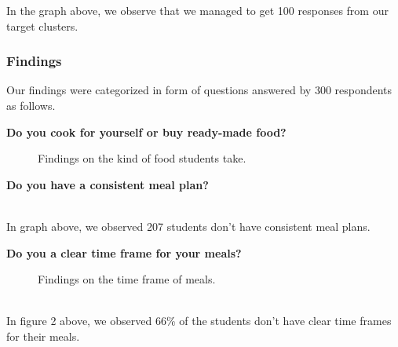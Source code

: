 \documentclass{article}
\begin{document}
In the graph above, we observe that we managed to get 100 responses from our target clusters.

\newpage
\subsubsection{Findings}

Our findings were categorized in form of questions answered by 300 respondents as follows.

\noindent
\textbf{Do you cook for yourself or buy ready-made food?}

\begin{figure}[h]
\caption{Findings on the kind of food students take.}
\end{figure}

\noindent
\textbf{Do you have a consistent meal plan?}
    \begin{center}
    
\end{center}
\\
In graph above, we observed 207 students don't have consistent meal plans.


\noindent
\textbf{Do you a clear time frame for your meals?}
\begin{figure}[h]
    \centering
\caption{Findings on the time frame of meals.}
\end{figure}
\\
In figure 2 above, we observed 66\% of the students don't have clear time frames for their meals.
\end{document}
